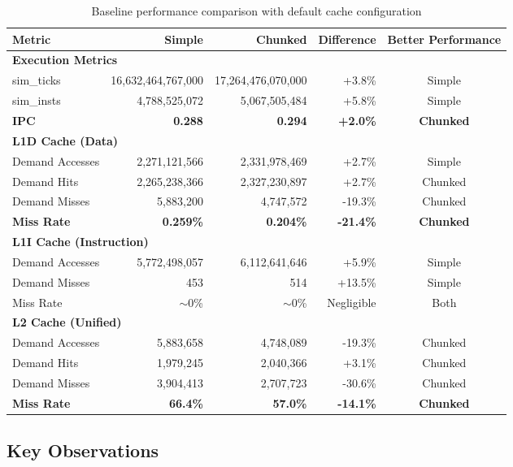 \documentclass[12pt,a4paper]{article}
\begin{document}
\begin{table}[H]
\centering
\small
\begin{tabular}{p{4cm}rrrc}
\toprule
\textbf{Metric} & \textbf{Simple} & \textbf{Chunked} & \textbf{Difference} & \textbf{Better Performance} \\
\midrule
\multicolumn{5}{l}{\textbf{Execution Metrics}} \\
sim\_ticks & 16,632,464,767,000 & 17,264,476,070,000 & +3.8\% & Simple \\
sim\_insts & 4,788,525,072 & 5,067,505,484 & +5.8\% & Simple \\
\textbf{IPC} & \textbf{0.288} & \textbf{0.294} & \textbf{+2.0\%} & \textbf{Chunked} \\
\midrule
\multicolumn{5}{l}{\textbf{L1D Cache (Data)}} \\
Demand Accesses & 2,271,121,566 & 2,331,978,469 & +2.7\% & Simple \\
Demand Hits & 2,265,238,366 & 2,327,230,897 & +2.7\% & Chunked \\
Demand Misses & 5,883,200 & 4,747,572 & -19.3\% & Chunked \\
\textbf{Miss Rate} & \textbf{0.259\%} & \textbf{0.204\%} & \textbf{-21.4\%} & \textbf{Chunked} \\
\midrule
\multicolumn{5}{l}{\textbf{L1I Cache (Instruction)}} \\
Demand Accesses & 5,772,498,057 & 6,112,641,646 & +5.9\% & Simple \\
Demand Misses & 453 & 514 & +13.5\% & Simple \\
Miss Rate & $\sim$0\% & $\sim$0\% & Negligible & Both \\
\midrule
\multicolumn{5}{l}{\textbf{L2 Cache (Unified)}} \\
Demand Accesses & 5,883,658 & 4,748,089 & -19.3\% & Chunked \\
Demand Hits & 1,979,245 & 2,040,366 & +3.1\% & Chunked \\
Demand Misses & 3,904,413 & 2,707,723 & -30.6\% & Chunked \\
\textbf{Miss Rate} & \textbf{66.4\%} & \textbf{57.0\%} & \textbf{-14.1\%} & \textbf{Chunked} \\
\bottomrule
\end{tabular}
\caption{Baseline performance comparison with default cache configuration}
\label{tab:baseline_stats}
\end{table}

\subsection{Key Observations}
\end{document}

